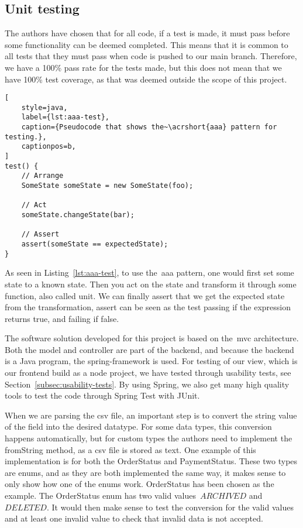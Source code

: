 \subsection{Unit testing}\label{subsec:unit-tests}

The authors have chosen that for all code, if a test is made, it must pass before some functionality can be
deemed completed.
This means that it is common to all tests that they must pass when code is pushed to our main branch.
Therefore, we have a 100\% pass rate for the tests made, but this does not mean that we
have 100\% test coverage, as that was deemed outside the scope of this project.

\begin{lstlisting}[
    style=java,
    label={lst:aaa-test},
    caption={Pseudocode that shows the~\acrshort{aaa} pattern for testing.},
    captionpos=b,
]
test() {
    // Arrange
    SomeState someState = new SomeState(foo);

    // Act
    someState.changeState(bar);

    // Assert
    assert(someState == expectedState);
}
\end{lstlisting}

As seen in Listing~\ref{lst:aaa-test}, to use the~\acrshort{aaa} pattern,
one would first set some state to a known state.
Then you act on the state and transform it through some function, also called unit.
We can finally assert that we get the expected state from the transformation, assert can be seen
as the test passing if the expression returns true, and failing if false.

The software solution developed for this project is based on the~\acrfull{mvc} architecture.
Both the model and controller are part of the backend, and because the backend is a Java program,
the spring-framework is used.
For testing of our view, which is our frontend build as a node project, we have tested through usability tests,
see Section~\ref{subsec:usability-tests}.
By using Spring, we also get many high quality tools to test the code through Spring Test with JUnit.

When we are parsing the csv file, an important step is to convert the string value of the field into the desired
datatype.
For some data types, this conversion happens automatically, but for custom types the authors need to implement the
fromString method, as a csv file is stored as text.
One example of this implementation is for both the OrderStatus and PaymentStatus.
These two types are enums, and as they are both implemented the same way, it makes sense to only show how one of the
enums work.
OrderStatus has been chosen as the example.
The OrderStatus enum has two valid values~\(ARCHIVED\) and~\(DELETED\).
It would then make sense to test the conversion for the valid values and at least one invalid value to check that
invalid data is not accepted.

